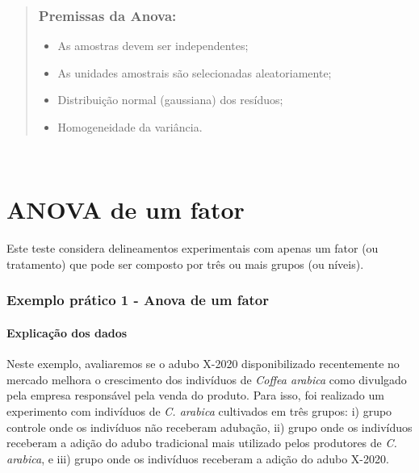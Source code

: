 \documentclass[
]{book}
\providecommand{\tightlist}{%
  \setlength{\itemsep}{0pt}\setlength{\parskip}{0pt}}
\begin{document}
\begin{quote}
\hypertarget{premissas-da-anova}{%
\subsubsection{Premissas da Anova:}\label{premissas-da-anova}}

\begin{itemize}
\tightlist
\item
  As amostras devem ser independentes;
\item
  As unidades amostrais são selecionadas aleatoriamente;
\item
  Distribuição normal (gaussiana) dos resíduos;
\item
  Homogeneidade da variância.
\end{itemize}
\end{quote}

~

\hypertarget{anova-de-um-fator}{%
\section{ANOVA de um fator}\label{anova-de-um-fator}}

Este teste considera delineamentos experimentais com apenas um fator (ou tratamento) que pode ser composto por três ou mais grupos (ou níveis).

\hypertarget{exemplo-pruxe1tico-1---anova-de-um-fator}{%
\subsubsection{Exemplo prático 1 - Anova de um fator}\label{exemplo-pruxe1tico-1---anova-de-um-fator}}

\hypertarget{explicauxe7uxe3o-dos-dados-6}{%
\paragraph{Explicação dos dados}\label{explicauxe7uxe3o-dos-dados-6}}

Neste exemplo, avaliaremos se o adubo X-2020 disponibilizado recentemente no mercado melhora o crescimento dos indivíduos de \emph{Coffea arabica} como divulgado pela empresa responsável pela venda do produto. Para isso, foi realizado um experimento com indivíduos de \emph{C. arabica} cultivados em três grupos: i) grupo controle onde os indivíduos não receberam adubação, ii) grupo onde os indivíduos receberam a adição do adubo tradicional mais utilizado pelos produtores de \emph{C. arabica}, e iii) grupo onde os indivíduos receberam a adição do adubo X-2020.
\end{document}
